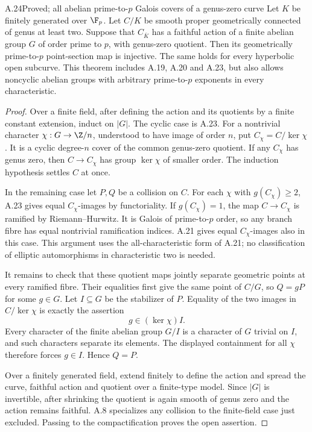 \begin{claim}{A.24}{Proved; all abelian prime-to-$p$ Galois covers of a genus-zero curve}
Let $K$ be finitely generated over $\F_p$. Let $C/K$ be
smooth proper geometrically connected of genus at least
two. Suppose that $C_{\overline K}$ has a faithful action
of a finite abelian group $G$ of order prime to $p$, with
genus-zero quotient. Then its geometrically prime-to-$p$
point-section map is injective. The same holds for every
hyperbolic open subcurve. This theorem includes A.19,
A.20 and A.23, but also allows noncyclic abelian groups
with arbitrary prime-to-$p$ exponents in every characteristic.
\end{claim}
\begin{proof}
Over a finite field, after defining the action and its
quotients by a finite constant extension, induct on $|G|$.
The cyclic case is A.23. For a nontrivial character
$\chi:G\to\Z/n$, understood to have image of order $n$,
put $C_\chi=C/\ker\chi$. It is a cyclic degree-$n$
cover of the common genus-zero quotient. If any
$C_\chi$ has genus zero, then $C\to C_\chi$ has group
$\ker\chi$ of smaller order. The induction hypothesis
settles $C$ at once.

In the remaining case let $P,Q$ be a collision on $C$.
For each $\chi$ with $g(C_\chi)\ge2$, A.23 gives equal
$C_\chi$-images by functoriality. If $g(C_\chi)=1$, the
map $C\to C_\chi$ is ramified by Riemann--Hurwitz. It is
Galois of prime-to-$p$ order, so any branch fibre has
equal nontrivial ramification indices. A.21 gives equal
$C_\chi$-images also in this case. This argument uses
the all-characteristic form of A.21; no classification
of elliptic automorphisms in characteristic two is needed.

It remains to check that these quotient maps jointly
separate geometric points at every ramified fibre. Their
equalities first give the same point of $C/G$, so
$Q=gP$ for some $g\in G$. Let $I\subseteq G$ be the
stabilizer of $P$. Equality of the two images in
$C/\ker\chi$ is exactly the assertion
\[
 g\in(\ker\chi)I.
\]
Every character of the finite abelian group $G/I$ is a
character of $G$ trivial on $I$, and such characters
separate its elements. The displayed containment for
all $\chi$ therefore forces $g\in I$. Hence $Q=P$.

Over a finitely generated field, extend finitely to define
the action and spread the curve, faithful action and
quotient over a finite-type model. Since $|G|$ is
invertible, after shrinking the quotient is again smooth
of genus zero and the action remains faithful. A.8
specializes any collision to the finite-field case just
excluded. Passing to the compactification proves the
open assertion.
\end{proof}

